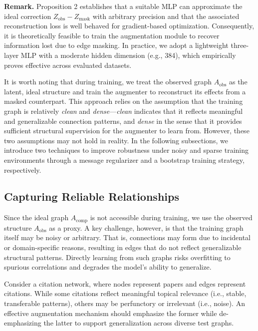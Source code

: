 \documentclass[letterpaper]{article} \usepackage{aaai2026}  \usepackage{times}  \usepackage{helvet}  \usepackage{courier}  \usepackage[hyphens]{url}  \usepackage{graphicx} \urlstyle{rm} \def\UrlFont{\rm}  \usepackage{natbib}  \usepackage{caption} \frenchspacing  \setlength{\pdfpagewidth}{8.5in}  \setlength{\pdfpageheight}{11in}
\begin{document}
\textbf{Remark.}
Proposition 2 establishes that a suitable MLP can approximate the ideal correction \(Z_{\mathrm{obs}} - Z_{\mathrm{mask}}\) with arbitrary precision and that the associated reconstruction loss is well behaved for gradient-based optimization. Consequently, it is theoretically feasible to train the augmentation module to recover information lost due to edge masking. In practice, we adopt a lightweight three-layer MLP with a moderate hidden dimension (e.g., 384), which empirically proves effective across evaluated datasets.

It is worth noting that during training, we treat the observed graph \( A_{\text{obs}} \) as the latent, ideal structure and train the augmenter to reconstruct its effects from a masked counterpart. This approach relies on the assumption that the training graph is relatively \textit{clean} and \textit{dense}—\textit{clean} indicates that it reflects meaningful and generalizable connection patterns, and \textit{dense} in the sense that it provides sufficient structural supervision for the augmenter to learn from.
However, these two assumptions may not hold in reality. In the following subsections, we introduce two techniques to improve robustness under noisy and sparse training environments through a message regularizer and a bootstrap training strategy, respectively.

\subsection{Capturing Reliable Relationships}

Since the ideal graph \( A_{\text{comp}} \) is not accessible during training, we use the observed structure \( A_{\text{obs}} \) as a proxy. A key challenge, however, is that the training graph itself may be noisy or arbitrary. That is, connections may form due to incidental or domain-specific reasons, resulting in edges that do not reflect generalizable structural patterns. Directly learning from such graphs risks overfitting to spurious correlations and degrades the model’s ability to generalize.

Consider a citation network, where nodes represent papers and edges represent citations. While some citations reflect meaningful topical relevance (i.e., stable, transferable patterns), others may be perfunctory or irrelevant (i.e., noise). An effective augmentation mechanism should emphasize the former while de-emphasizing the latter to support generalization across diverse test graphs.
\end{document}
